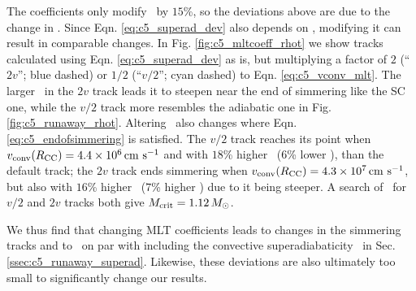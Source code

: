 
The \citeal{stev79} coefficients only modify \vconv\ by $15$\%, so the deviations above are due to the change in \deltanab.  Since Eqn. \ref{eq:c5_superad_dev} also depends on \vconv, modifying it can result in comparable changes.  In Fig. \ref{fig:c5_mltcoeff_rhot} we show tracks calculated using Eqn. \ref{eq:c5_superad_dev} as is, but multiplying a factor of $2$ (``$2v$''; blue dashed) or $1/2$ (``$v/2$''; cyan dashed) to Eqn. \ref{eq:c5_vconv_mlt}.  The larger \deltanab\ in the $2v$ track leads it to steepen near the end of simmering like the SC one, while the $v/2$ track more resembles the adiabatic one in Fig. \ref{fig:c5_runaway_rhot}.  Altering \vconv\ also changes where Eqn. \ref{eq:c5_endofsimmering} is satisfied.  The $v/2$ track reaches its \citeal{wooswk04} point when $\vconvrcc = 4.4\times10^6\,\cmpsec$ and with $18$\% higher \rhoc\ ($6$\% lower \Tc), than the default track; the $2v$ track ends simmering when $\vconvrcc = 4.3\times10^7\,\cmpsec$, but also with $16$\% higher \rhoc\ ($7$\% higher \Tc) due to it being steeper.  A search of \Mcrit\ for $v/2$ and $2v$ tracks both give $\Mcrit = 1.12\,\Msun$.



We thus find that changing MLT coefficients leads to changes in the simmering tracks and to \Mcrit\ on par with including the convective superadiabaticity \dnabconv\ in Sec. \ref{ssec:c5_runaway_superad}.  Likewise, these deviations are also ultimately too small to significantly change our results.



